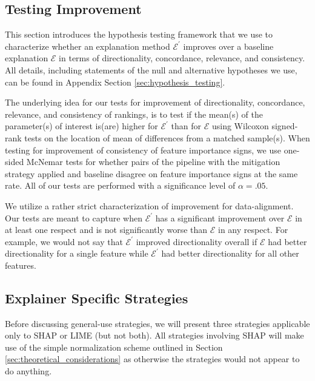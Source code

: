 \documentclass[mnsc,blindrev]{informs3}
\newcommand{\mE}{\mathcal{E}}
\begin{document}
    \subsection{Testing Improvement}
        \label{sec:improvement}
        This section introduces the hypothesis testing framework that we use to characterize whether an explanation method $\mE^\prime$ improves over a baseline explanation $\mE$ in terms of directionality, concordance, relevance, and consistency. All details, including statements of the null and alternative hypotheses we use, can be found in Appendix Section \ref{sec:hypothesis_testing}.
        
        
        The underlying idea for our tests for improvement of directionality, concordance, relevance, and consistency of rankings, is to test if the mean(s) of the parameter(s) of interest is(are) higher for $\mE^\prime$ than for $\mE$ using Wilcoxon signed-rank tests on the location of mean of differences from a matched sample(s). When testing for improvement of consistency of feature importance signs, we use one-sided McNemar tests for whether pairs of the pipeline with the mitigation strategy applied and baseline disagree on feature importance signs at the same rate. All of our tests are performed with a significance level of $\alpha=.05$. 
        
        We utilize a rather strict characterization of improvement for data-alignment. Our tests are meant to capture when $\mE^\prime$ has a significant improvement over $\mE$ in at least one respect and is not significantly worse than $\mE$ in any respect. For example, we would not say that $\mE^\prime$ improved directionality overall if $\mE$ had better directionality for a single feature while $\mE^\prime$ had better directionality for all other features. 
        
        
     


    \subsection{Explainer Specific Strategies}
        Before discussing general-use strategies, we will present three strategies applicable only to SHAP or LIME (but not both). All strategies involving SHAP will make use of the simple normalization scheme outlined in Section \ref{sec:theoretical_considerations} as otherwise the strategies would not appear to do anything.
\end{document}
